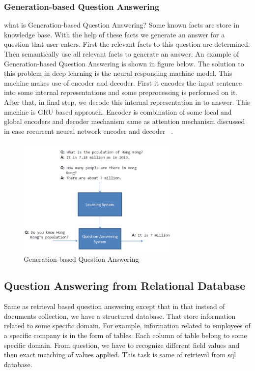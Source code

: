 \documentclass{doublecol-new}
\theoremstyle{TH}{
\newtheorem{lemma}{Lemma}
\newtheorem{theorem}[lemma]{Theorem}
\newtheorem{corrolary}[lemma]{Corrolary}
\newtheorem{conjecture}[lemma]{Conjecture}
\newtheorem{proposition}[lemma]{Proposition}
\newtheorem{claim}[lemma]{Claim}
\newtheorem{stheorem}[lemma]{Wrong Theorem}
\newtheorem{algorithm}{Algorithm}
}
\theoremstyle{THrm}{
\newtheorem{definition}{Definition}[section]
\newtheorem{question}{Question}[section]
\newtheorem{remark}{Remark}
\newtheorem{scheme}{Scheme}
}
\theoremstyle{THhit}{
\newtheorem{case}{Case}[section]
}
\begin{document}
\subsubsection{Generation-based Question Answering}
what is Generation-based Question Answering? Some known facts are store in knowledge base. With the help of these facts we generate an answer for a question that user enters. First the relevant facts to this question are determined. Then semantically use all relevant facts to generate an answer. An example of Generation-based Question Answering is shown in figure below. The solution to this problem in deep learning is the neural responding machine model. This machine makes use of encoder and decoder. First it encodes the input sentence into some internal representations and some preprocessing is performed on it. After that, in final step, we decode this internal representation in to answer. This machine is GRU based approach. Encoder is combination of some local and global encoders and decoder mechanism same as attention mechanism discussed in case recurrent neural network encoder and decoder ~\cite{shang2015neural}.  


\begin{figure}[h]
	\centerline{\includegraphics[width=8cm,keepaspectratio]{image/generation-based-QA.PNG}}
	\label{fig:Generation-based Question Answering}
	\caption{Generation-based Question Answering}
\end{figure}


\subsection{Question Answering from Relational Database}
 Same as retrieval based question answering except that in that instead of documents collection, we have a structured database. That store information related to some specific domain. For example, information related to employees of a specific company is in the form of tables. Each column of table belong to some specific domain. From question, we have to recognize different field values and then exact matching of values applied. This task is same of retrieval from sql database. 
\end{document}
